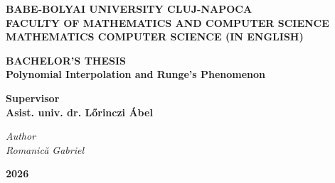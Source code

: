 \documentclass[12pt, a4paper]{article}
\theoremstyle{plain}
\theoremstyle{definition}
\theoremstyle{remark}
\begin{document}

\begin{titlepage}
    \begin{center}
        \textbf{BABE-BOLYAI UNIVERSITY CLUJ-NAPOCA} \\[0.5cm]
        \textbf{FACULTY OF MATHEMATICS AND COMPUTER SCIENCE} \\[0.5cm]
        \textbf{MATHEMATICS COMPUTER SCIENCE (IN ENGLISH)}

        \vspace*{6cm}

        {\LARGE \textbf{BACHELOR'S THESIS}} \\[2cm]

        {\Large \textbf{Polynomial Interpolation and Runge's Phenomenon}}
    \end{center}

    \vspace*{4cm}

    \noindent
    \begin{minipage}[t]{0.7\textwidth}
        \textbf{Supervisor} \\[0em]
        \textbf{Asist. univ. dr. L\H{o}rinczi \'Abel}
    \end{minipage}%
    \begin{minipage}[t]{0.3\textwidth}
        \vspace*{1.5cm}
        \raggedleft
        \textit{Author \\ Romanic\u{a} Gabriel}
    \end{minipage}

    \vfill
    \begin{center}
        \textbf{2026}
    \end{center}
\end{titlepage}
\end{document}
